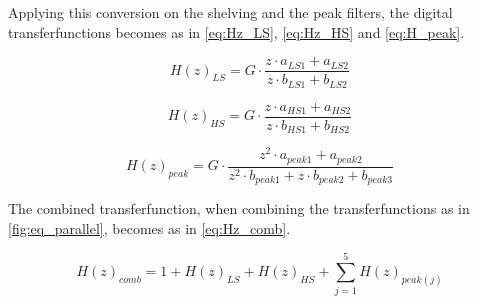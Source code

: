 Applying this conversion on the shelving and the peak filters, the digital transferfunctions becomes as in \autoref{eq:Hz_LS}, \autoref{eq:Hz_HS} and \autoref{eq:H_peak}.

\begin{equation}\label{eq:Hz_LS}
        H(z)_{LS} = G \cdot \frac{z \cdot a_{LS1} + a_{LS2}}{z \cdot b_{LS1} + b_{LS2}}
    \end{equation}
    
    \startexplain
    \stopexplain
    
\begin{equation}\label{eq:Hz_HS}
        H(z)_{HS} = G \cdot \frac{z \cdot a_{HS1} + a_{HS2}}{z \cdot b_{HS1} + b_{HS2}}
    \end{equation}
    
    \startexplain
    \stopexplain

\begin{equation}\label{eq:Hz_peak}
        H(z)_{peak} = G \cdot \frac{z^2 \cdot a_{peak1} + a_{peak2}}{z^2 \cdot b_{peak1} + z \cdot b_{peak2} + b_{peak3}}
    \end{equation}
    
    \startexplain
    \stopexplain

The combined transferfunction, when combining the transferfunctions as in \autoref{fig:eq_parallel}, becomes as in \autoref{eq:Hz_comb}.

\begin{equation}\label{eq:Hz_comb}
        H(z)_{comb} = 1 + H(z)_{LS} + H(z)_{HS} +  \sum_{j=1}^{5} H(z)_{peak(j)}
    \end{equation}

